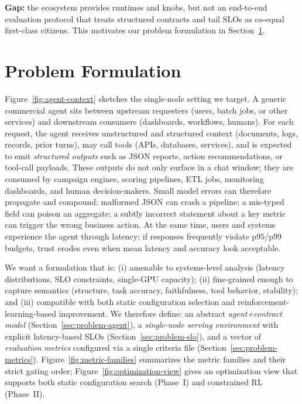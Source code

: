 \documentclass[11pt]{article}
\newcommand{\pninetyfive}{\ensuremath{\mathrm{p95}}}
\newcommand{\pninetynine}{\ensuremath{\mathrm{p99}}}
\newcommand{\slo}{\ensuremath{\mathrm{SLO}}}
\begin{document}
\textbf{Gap:} the ecosystem provides runtimes and knobs, but not an end-to-end evaluation protocol that treats structured contracts and tail \slo s as co-equal first-class citizens.
This motivates our problem formulation in Section~\ref{sec:problem}.

\section{Problem Formulation}
\label{sec:problem}

Figure~\ref{fig:agent-context} sketches the single-node setting we target.
A generic commercial agent sits between upstream requesters (users, batch jobs, or other services) and downstream consumers (dashboards, workflows, humans).
For each request, the agent receives unstructured and structured context (documents, logs, records, prior turns), may call tools (APIs, databases, services), and is expected to emit \emph{structured outputs} such as JSON reports, action recommendations, or tool-call payloads.
These outputs do not only surface in a chat window; they are consumed by campaign engines, scoring pipelines, ETL jobs, monitoring dashboards, and human decision-makers.
Small model errors can therefore propagate and compound:
malformed JSON can crash a pipeline;
a mis-typed field can poison an aggregate;
a subtly incorrect statement about a key metric can trigger the wrong business action.
At the same time, users and systems experience the agent through latency: if responses frequently violate \pninetyfive/\pninetynine budgets, trust erodes even when mean latency and accuracy look acceptable.

We want a formulation that is:
(i) amenable to systems-level analysis (latency distributions, SLO constraints, single-GPU capacity);
(ii) fine-grained enough to capture semantics (structure, task accuracy, faithfulness, tool behavior, stability);
and (iii) compatible with both static configuration selection and reinforcement-learning-based improvement.
We therefore define:
an abstract \emph{agent+contract model} (Section~\ref{sec:problem-agent}),
a \emph{single-node serving environment} with explicit latency-based SLOs (Section~\ref{sec:problem-slo}),
and a vector of \emph{evaluation metrics} configured via a single criteria file (Section~\ref{sec:problem-metrics}).
Figure~\ref{fig:metric-families} summarizes the metric families and their strict gating order; Figure~\ref{fig:optimization-view} gives an optimization view that supports both static configuration search (Phase~I) and constrained RL (Phase~II).
\end{document}
